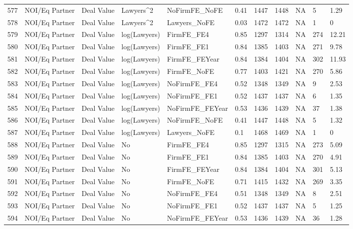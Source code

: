 \documentclass{article}
\begin{document}
\begin{table}[H]
\begin{tabular}{rllllllllll}
  577 & NOI/Eq Partner & Deal Value & Lawyers^2 & NoFirmFE\_NoFE & 0.41 & 1447 & 1448 & NA & 5 & 1.29 \\ 
  578 & NOI/Eq Partner & Deal Value & Lawyers^2 & Lawyers\_NoFE & 0.03 & 1472 & 1472 & NA & 1 & 0 \\ 
  579 & NOI/Eq Partner & Deal Value & log(Lawyers) & FirmFE\_FE4 & 0.85 & 1297 & 1314 & NA & 274 & 12.21 \\ 
  580 & NOI/Eq Partner & Deal Value & log(Lawyers) & FirmFE\_FE1 & 0.84 & 1385 & 1403 & NA & 271 & 9.78 \\ 
  581 & NOI/Eq Partner & Deal Value & log(Lawyers) & FirmFE\_FEYear & 0.84 & 1384 & 1404 & NA & 302 & 11.93 \\ 
  582 & NOI/Eq Partner & Deal Value & log(Lawyers) & FirmFE\_NoFE & 0.77 & 1403 & 1421 & NA & 270 & 5.86 \\ 
  583 & NOI/Eq Partner & Deal Value & log(Lawyers) & NoFirmFE\_FE4 & 0.52 & 1348 & 1349 & NA & 9 & 2.53 \\ 
  584 & NOI/Eq Partner & Deal Value & log(Lawyers) & NoFirmFE\_FE1 & 0.52 & 1437 & 1437 & NA & 6 & 1.35 \\ 
  585 & NOI/Eq Partner & Deal Value & log(Lawyers) & NoFirmFE\_FEYear & 0.53 & 1436 & 1439 & NA & 37 & 1.38 \\ 
  586 & NOI/Eq Partner & Deal Value & log(Lawyers) & NoFirmFE\_NoFE & 0.41 & 1447 & 1448 & NA & 5 & 1.32 \\ 
  587 & NOI/Eq Partner & Deal Value & log(Lawyers) & Lawyers\_NoFE & 0.1 & 1468 & 1469 & NA & 1 & 0 \\ 
  588 & NOI/Eq Partner & Deal Value & No & FirmFE\_FE4 & 0.85 & 1297 & 1315 & NA & 273 & 5.09 \\ 
  589 & NOI/Eq Partner & Deal Value & No & FirmFE\_FE1 & 0.84 & 1385 & 1403 & NA & 270 & 4.91 \\ 
  590 & NOI/Eq Partner & Deal Value & No & FirmFE\_FEYear & 0.84 & 1384 & 1404 & NA & 301 & 5.13 \\ 
  591 & NOI/Eq Partner & Deal Value & No & FirmFE\_NoFE & 0.71 & 1415 & 1432 & NA & 269 & 3.35 \\ 
  592 & NOI/Eq Partner & Deal Value & No & NoFirmFE\_FE4 & 0.51 & 1348 & 1349 & NA & 8 & 2.51 \\ 
  593 & NOI/Eq Partner & Deal Value & No & NoFirmFE\_FE1 & 0.52 & 1437 & 1437 & NA & 5 & 1.25 \\ 
  594 & NOI/Eq Partner & Deal Value & No & NoFirmFE\_FEYear & 0.53 & 1436 & 1439 & NA & 36 & 1.28 \\ 

\end{tabular}
\end{table}
\end{document}
